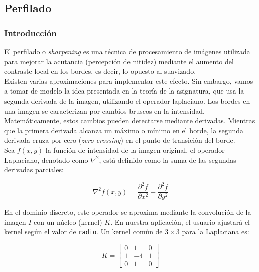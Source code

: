 \documentclass[11pt]{article}
\begin{document}
              \clearpage

  \subsection{Perfilado}

      \subsubsection{Introducción}

          \noindent
          El perfilado o \textit{sharpening} es una técnica de procesamiento de imágenes utilizada para mejorar la acutancia (percepción de nitidez) mediante el aumento del contraste local en los bordes, es decir, lo opuesto al suavizado. \cite{enwiki:1317014229} \\

          Existen varias aproximaciones para implementar este efecto. Sin embargo, vamos
          a tomar de modelo la idea presentada en la teoría de la asignatura, que usa la
          segunda derivada de la imagen, utilizando el operador laplaciano. Los bordes en
          una imagen se caracterizan por cambios bruscos en la intensidad.
          Matemáticamente, estos cambios pueden detectarse mediante derivadas. Mientras
          que la primera derivada alcanza un máximo o mínimo en el borde, la segunda
          derivada cruza por cero (\textit{zero-crossing}) en el punto de transición del
          borde. \cite{enwiki:1320845251} \\

          Sea \(f(x,y)\) la función de intensidad de la imagen original, el operador
          Laplaciano, denotado como \(\nabla^2\), está definido como la suma de las
          segundas derivadas parciales: \cite{opencv_laplaceoperator}

          \[ \nabla^2 f(x,y) = \frac{\partial^2 f}{\partial x^2} + \frac{\partial^2 f}{\partial y^2} \]

          En el dominio discreto, este operador se aproxima mediante la convolución de la
          imagen \(I\) con un núcleo (kernel) \(K\). En nuestra aplicación, el usuario
          ajustará el kernel según el valor de \texttt{radio}. Un kernel común de \(3
          \times 3\) para la Laplaciana es:

          \[
              K = \begin{bmatrix}
                  0 & 1  & 0 \\
                  1 & -4 & 1 \\
                  0 & 1  & 0
              \end{bmatrix}
          \]
\end{document}

